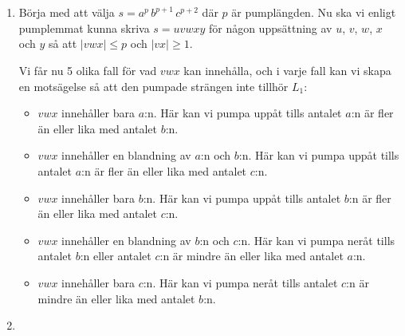 \documentclass{article}
\begin{document}
\section{}

\begin{enumerate}[label=(\alph*)]
    \item 
        
        
            
        
        Börja med att välja $s = a^p \, b^{p+1} \,  c^{p+2}$ där $p$ är pumplängden. Nu ska vi enligt pumplemmat kunna skriva $s = uvwxy $ för någon uppsättning av $u$, $v$, $w$, $x$ och $y$ så att $| vwx | \le p$ och $|vx| \ge 1$.
        
        Vi får nu 5 olika fall för vad $vwx$ kan innehålla, och i varje fall kan vi skapa en motsägelse så att den pumpade strängen inte tillhör $L_1$:
        
        \begin{itemize}
            \item $vwx$ innehåller bara $a$:n. Här kan vi pumpa uppåt tills antalet $a$:n är fler än eller lika med antalet $b$:n.
            \item $vwx$ innehåller en blandning av $a$:n och $b$:n. Här kan vi pumpa uppåt tills antalet $a$:n är fler än eller lika med antalet $c$:n.
            \item $vwx$ innehåller bara $b$:n. Här kan vi pumpa uppåt tills antalet $b$:n är fler än eller lika med antalet $c$:n. 
            \item $vwx$ innehåller en blandning av $b$:n och $c$:n. Här kan vi pumpa neråt tills antalet $b$:n eller antalet $c$:n är mindre än eller lika med antalet $a$:n.
            \item $vwx$ innehåller bara $c$:n. Här kan vi pumpa neråt tills antalet $c$:n är mindre än eller lika med antalet $b$:n.
        \end{itemize}

    \item 
        
\end{enumerate}
\end{document}
